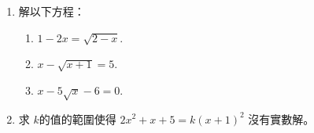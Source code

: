\documentclass[11pt]{article}
\begin{document}
\begin{enumerate}
            \hrulefill
            
            \hrulefill
            
            \hrulefill

        \pagebreak
        \item 解以下方程：\begin{enumerate}
            \item $1-2x=\sqrt{2-x}$.
            \item $x-\sqrt{x+1}=5$.
            \item $x-5\sqrt{x}-6=0$.
        \end{enumerate}

        \hrulefill
            
            \hrulefill
            
            \hrulefill
            
            \hrulefill
            
            \hrulefill
            
            \hrulefill
            
            \hrulefill
            
            \hrulefill
            
            \hrulefill
            
            \hrulefill
            
            \hrulefill

            \hrulefill
            
            \hrulefill
            
            \hrulefill
            
            \hrulefill
            
            \hrulefill
            
            \hrulefill
            
            \hrulefill
            
            \hrulefill
            
            \hrulefill
            
            \hrulefill
            
            \hrulefill

        \pagebreak
        \item 求 $k$的值的範圍使得 $2x^2+x+5=k(x+1)^2$ 沒有實數解。
        
        \hrulefill
            
            \hrulefill
            

\end{enumerate}
\end{document}
